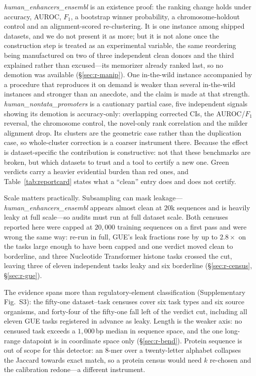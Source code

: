 \documentclass[webpdf,modern,large,namedate]{oup-authoring-template}%
\begin{document}
\textit{human\_enhancers\_ensembl} is an existence proof: the ranking change holds under accuracy, AUROC, $F_1$, a bootstrap winner probability, a chromosome-holdout control and an alignment-scored re-clustering. It is one instance among shipped datasets, and we do not present it as more; but it is not alone once the construction step is treated as an experimental variable, the same reordering being manufactured on two of three independent clean donors and the third explained rather than excused---its memorizer already ranked last, so no demotion was available (\S\ref{sec:r-manip}). One in-the-wild instance accompanied by a procedure that reproduces it on demand is weaker than several in-the-wild instances and stronger than an anecdote, and the claim is made at that strength. \textit{human\_nontata\_promoters} is a cautionary partial case, five independent signals showing its demotion is accuracy-only: overlapping corrected CIs, the AUROC/$F_1$ reversal, the chromosome control, the novel-only rank correlation and the milder alignment drop. Its clusters are the geometric case rather than the duplication case, so whole-cluster correction is a coarser instrument there. Because the effect is dataset-specific the contribution is constructive: not that these benchmarks are broken, but which datasets to trust and a tool to certify a new one. Green verdicts carry a heavier evidential burden than red ones, and Table~\ref{tab:reportcard} states what a ``clean'' entry does and does not certify.

Scale matters practically. Subsampling can mask leakage---\textit{human\_enhancers\_ensembl} appears almost clean at $20$k sequences and is heavily leaky at full scale---so audits must run at full dataset scale. Both censuses reported here were capped at $20{,}000$ training sequences on a first pass and were wrong the same way: re-run in full, GUE's leak fractions rose by up to $2.8\times$ on the tasks large enough to have been capped and one verdict moved clean to borderline, and three Nucleotide Transformer histone tasks crossed the cut, leaving three of eleven independent tasks leaky and six borderline (\S\ref{sec:r-census}, \S\ref{sec:r-gue}).

The evidence spans more than regulatory-element classification (Supplementary Fig.~S3): the fifty-one dataset--task censuses cover six task types and six source organisms, and forty-four of the fifty-one fall left of the verdict cut, including all eleven GUE tasks registered in advance as leaky. Length is the weaker axis: no censused task exceeds a $1{,}000$\,bp median in sequence space, and the one long-range datapoint is in coordinate space only (\S\ref{sec:r-bend}). Protein sequence is out of scope for this detector: an $8$-mer over a twenty-letter alphabet collapses the Jaccard towards exact match, so a protein census would need $k$ re-chosen and the calibration redone---a different instrument.
\end{document}
